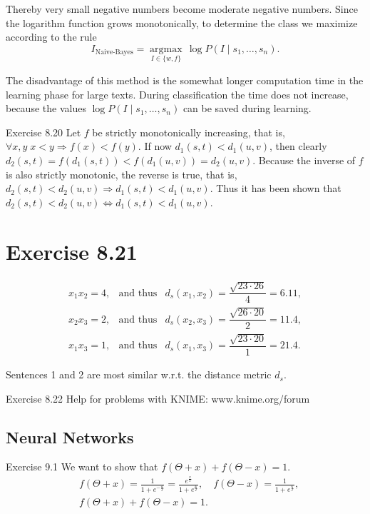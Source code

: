 \documentclass[10pt]{book}
\begin{document}
Thereby very small negative numbers become moderate negative numbers. Since the logarithm function grows monotonically, to determine the class we maximize according to the rule
\[
I_{\text{Naive-Bayes}}=\underset{I \in\{w, f\}}{\operatorname{argmax}}\, \log P\!\left(I \mid s_{1}, \ldots, s_{n}\right).
\]

The disadvantage of this method is the somewhat longer computation time in the learning phase for large texts. During classification the time does not increase, because the values $\log P\!\left(I \mid s_{1}, \ldots, s_{n}\right)$ can be saved during learning.

Exercise 8.20 Let $f$ be strictly monotonically increasing, that is, $\forall x,y\; x<y \Rightarrow f(x)<f(y)$. If now $d_{1}(s, t)<d_{1}(u, v)$, then clearly $d_{2}(s, t)=f\!\left(d_{1}(s, t)\right)<f\!\left(d_{1}(u, v)\right)=d_{2}(u, v)$. Because the inverse of $f$ is also strictly monotonic, the reverse is true, that is, $d_{2}(s, t)<d_{2}(u, v) \Rightarrow d_{1}(s, t)<d_{1}(u, v)$. Thus it has been shown that $d_{2}(s, t)<d_{2}(u, v) \Leftrightarrow d_{1}(s, t)<d_{1}(u, v)$.

\section{Exercise 8.21}
\[
\begin{array}{lll}
x_{1}x_{2}=4, & \text{and thus} & d_{s}\!\left(x_{1}, x_{2}\right)=\dfrac{\sqrt{23 \cdot 26}}{4}=6.11, \\[0.5ex]
x_{2}x_{3}=2, & \text{and thus} & d_{s}\!\left(x_{2}, x_{3}\right)=\dfrac{\sqrt{26 \cdot 20}}{2}=11.4, \\[0.5ex]
x_{1}x_{3}=1, & \text{and thus} & d_{s}\!\left(x_{1}, x_{3}\right)=\dfrac{\sqrt{23 \cdot 20}}{1}=21.4.
\end{array}
\]

Sentences 1 and 2 are most similar w.r.t. the distance metric $d_{s}$.

Exercise 8.22 Help for problems with KNIME: www.knime.org/forum

\subsection{Neural Networks}

Exercise 9.1 We want to show that $f(\Theta+x)+f(\Theta-x)=1$.
\[
\begin{aligned}
& f(\Theta+x)=\frac{1}{1+e^{-\frac{x}{T}}}=\frac{e^{\frac{x}{T}}}{1+e^{\frac{x}{T}}}, \quad f(\Theta-x)=\frac{1}{1+e^{\frac{x}{T}}}, \\
& f(\Theta+x)+f(\Theta-x)=1.
\end{aligned}
\]
\end{document}
